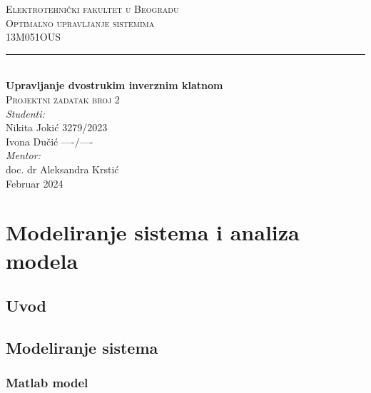 \documentclass[a4paper,11pt]{article}
\theoremstyle{definition} \newtheorem{deff}{Definicija}[section]
\theoremstyle{definition} \newtheorem{prim}[deff]{Primer}
\theoremstyle{plain} \newtheorem{teor}[deff]{Teorema}
\begin{document}
	
	\begin{titlepage}
		
		\newcommand{\HRule}{\rule{\linewidth}{0.5mm}} 							%
		\center 
		
		\textsc{\LARGE Elektrotehnički fakultet u Beogradu}\\[1cm]
		
		\textsc{\Large Optimalno upravljanje sistemima}\\[0.2cm]
		\textsc{\large 13M051OUS}\\[1cm] 										
		\HRule \\[0.8cm]
		{ \huge \bfseries Upravljanje dvostrukim inverznim klatnom}\\[0.7cm]								%
		\textsc{\large Projektni zadatak broj 2}\\[1cm]
		
		
		\large
		\vfill 
		\emph{Studenti:}\\
		Nikita Jokić 3279/2023\\[0.1cm]
		Ivona Dučić ----/----\\[1.5cm]		
		\emph{Mentor:}\\
		doc. dr Aleksandra Krstić\\[0.1cm]									
		{\large Februar 2024}\\[2cm]
	\end{titlepage}
	\tableofcontents
	\newpage
	
	\section{Modeliranje sistema i analiza modela}
	\subsection{Uvod} 
	
	
	
	
	\newpage
	
	\subsection{Modeliranje sistema} 
	
	
	
	
	\subsubsection{Matlab model}
	
\end{document}
